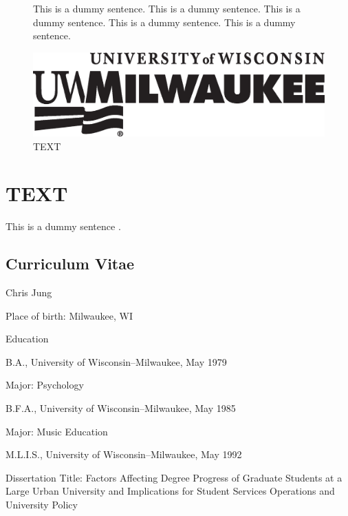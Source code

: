 \documentclass[12pt]{book}
\begin{document}
\begin{figure}
\caption{TEXT}\footnotesize
This is a dummy sentence. This is a dummy sentence. This is a dummy sentence. This is a dummy sentence. This is a dummy sentence.\par\centering
\includegraphics[width=\textwidth]{190214preferred_blk}
\end{figure}
\clearpage

\appendix

\begin{singlespacing}\end{singlespacing}

\chapter{TEXT}
This is a dummy sentence \citep{fama1993common}.
\clearpage

\begin{singlespacing}\chapter*{Curriculum Vitae}

\noindent Chris Jung

\phantom{}

\noindent Place of birth: Milwaukee, WI

\phantom{}

\noindent Education

B.A., University of Wisconsin--Milwaukee, May 1979

Major: Psychology

\phantom{}

B.F.A., University of Wisconsin--Milwaukee, May 1985

Major: Music Education

\phantom{}

M.L.I.S., University of Wisconsin--Milwaukee, May 1992

\phantom{}

\noindent Dissertation Title: Factors Affecting Degree Progress of Graduate Students at a Large Urban University and Implications for Student Services Operations and University Policy\par\end{singlespacing}
\clearpage
\end{document}
